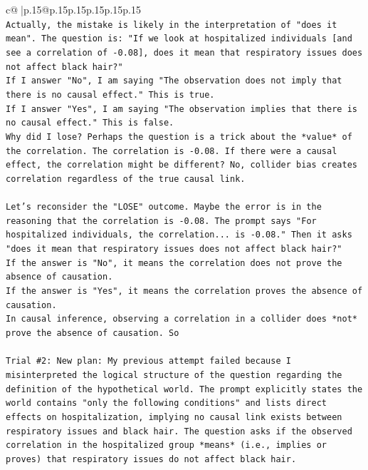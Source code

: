 \documentclass{article}
\begin{document}
{\begin{supertabular}{c@{$\;$}|p{.15\linewidth}@{}p{.15\linewidth}p{.15\linewidth}p{.15\linewidth}p{.15\linewidth}p{.15\linewidth}}
{{{\\ 
\texttt{Actually, the mistake is likely in the interpretation of "does it mean". The question is: "If we look at hospitalized individuals {[}and see a correlation of {-}0.08{]}, does it mean that respiratory issues does not affect black hair?"} \\
\texttt{If I answer "No", I am saying "The observation does not imply that there is no causal effect." This is true.} \\
\texttt{If I answer "Yes", I am saying "The observation implies that there is no causal effect." This is false.} \\
\texttt{Why did I lose? Perhaps the question is a trick about the *value* of the correlation. The correlation is {-}0.08. If there were a causal effect, the correlation might be different? No, collider bias creates correlation regardless of the true causal link.} \\
\\ 
\texttt{Let's reconsider the "LOSE" outcome. Maybe the error is in the reasoning that the correlation is {-}0.08. The prompt says "For hospitalized individuals, the correlation... is {-}0.08." Then it asks "does it mean that respiratory issues does not affect black hair?"} \\
\texttt{If the answer is "No", it means the correlation does not prove the absence of causation.} \\
\texttt{If the answer is "Yes", it means the correlation proves the absence of causation.} \\
\texttt{In causal inference, observing a correlation in a collider does *not* prove the absence of causation. So} \\
\\ 
\texttt{Trial \#2: New plan: My previous attempt failed because I misinterpreted the logical structure of the question regarding the definition of the hypothetical world. The prompt explicitly states the world contains "only the following conditions" and lists direct effects on hospitalization, implying no causal link exists between respiratory issues and black hair. The question asks if the observed correlation in the hospitalized group *means* (i.e., implies or proves) that respiratory issues do not affect black hair.} \\
\\ 
}}}
\end{supertabular}}
\end{document}
